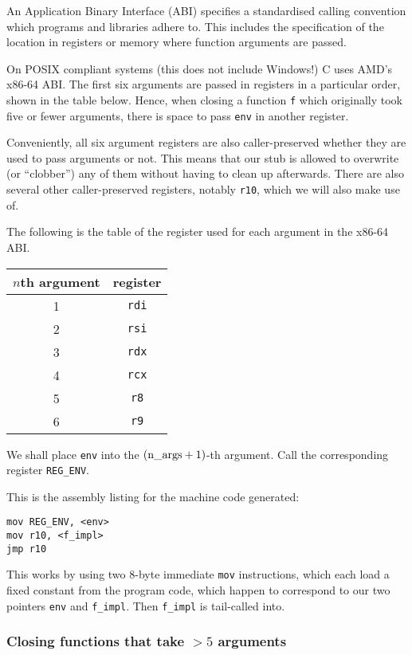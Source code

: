 \documentclass[12pt,a4paper,twoside,openright]{report}
\begin{document}
An Application Binary Interface (ABI) specifies a standardised calling
convention which programs and libraries adhere to. This includes the
specification of the location in registers or memory where function arguments
are passed.

On POSIX compliant systems (this does not include Windows!) C uses AMD's x86-64
ABI. The first six arguments are passed in registers in a particular order,
shown in the table below. Hence, when closing a function \lstinline!f! which
originally took five or fewer arguments, there is space to pass \lstinline!env!
in another register.

Conveniently, all six argument registers are also caller-preserved whether they
are used to pass arguments or not. This means that our stub is allowed to
overwrite (or ``clobber'') any of them without having to clean up afterwards.
There are also several other caller-preserved registers, notably
\lstinline!r10!, which we will also make use of.

The following is the table of the register used for each argument in the x86-64
ABI.

\begin{tabular}{ c | c }
  $n$th argument & register \\
  \hline
  1 & \lstinline!rdi! \\
  2 & \lstinline!rsi! \\
  3 & \lstinline!rdx! \\
  4 & \lstinline!rcx! \\
  5 & \lstinline!r8! \\
  6 & \lstinline!r9!
\end{tabular}

We shall place \lstinline!env! into the $(\text{\lstinline|n\_args|}+1)$-th
argument. Call the corresponding register \lstinline!REG_ENV!.

This is the assembly listing for the machine code generated:

\begin{lstlisting}
mov REG_ENV, <env>
mov r10, <f_impl>
jmp r10
\end{lstlisting}

This works by using two 8-byte immediate \lstinline!mov! instructions, which
each load a fixed constant from the program code, which happen to correspond to
our two pointers \lstinline!env! and \lstinline!f_impl!.
Then \lstinline!f_impl! is tail-called into.

\subsubsection{Closing functions that take $> 5$ arguments}
\end{document}
